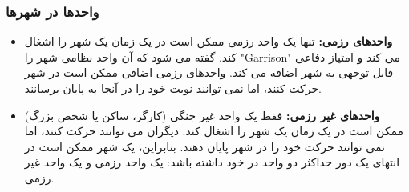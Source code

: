 \documentclass[]{article}
\begin{document}
\subsubsection*{{\titr واحدها در شهرها}}
\begin{itemize}
	\item \textbf{واحدهای رزمی:} تنها یک واحد رزمی ممکن است در یک زمان یک شهر را اشغال کند. گفته می شود که آن واحد نظامی شهر را "Garrison" می کند و امتیاز دفاعی قابل توجهی به شهر اضافه می کند. واحدهای رزمی اضافی ممکن است در شهر حرکت کنند، اما نمی توانند نوبت خود را در آنجا به پایان برسانند.
	\item \textbf{واحدهای غیر رزمی:} فقط یک واحد غیر جنگی (کارگر، ساکن یا شخص بزرگ) ممکن است در یک زمان یک شهر را اشغال کند. دیگران می توانند حرکت کنند، اما نمی توانند حرکت خود را در شهر پایان دهند. بنابراین، یک شهر ممکن است در انتهای یک دور حداکثر دو واحد در خود داشته باشد: یک واحد رزمی و یک واحد غیر رزمی.
\end{itemize}
\end{document}
